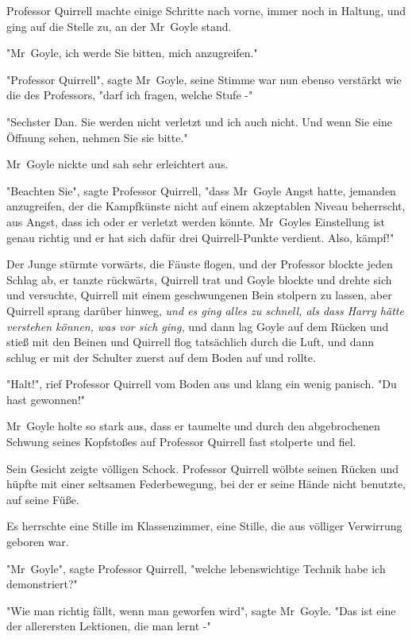 {Professor Quirrell machte einige Schritte nach vorne, immer noch in Haltung, und ging auf die Stelle zu, an der Mr~Goyle stand.

"Mr~Goyle, ich werde Sie bitten, mich anzugreifen."

"Professor Quirrell", sagte Mr~Goyle, seine Stimme war nun ebenso verstärkt wie die des Professors, "darf ich fragen, welche Stufe -"

"Sechster Dan. Sie werden nicht verletzt und ich auch nicht. Und wenn Sie eine Öffnung sehen, nehmen Sie sie bitte."

Mr~Goyle nickte und sah sehr erleichtert aus.

"Beachten Sie", sagte Professor Quirrell, "dass Mr~Goyle Angst hatte, jemanden anzugreifen, der die Kampfkünste nicht auf einem akzeptablen Niveau beherrscht, aus Angst, dass ich oder er verletzt werden könnte. Mr~Goyles Einstellung ist genau richtig und er hat sich dafür drei Quirrell-Punkte verdient. Also, kämpf!"

Der Junge stürmte vorwärts, die Fäuste flogen, und der Professor blockte jeden Schlag ab, er tanzte rückwärts, Quirrell trat und Goyle blockte und drehte sich und versuchte, Quirrell mit einem geschwungenen Bein stolpern zu lassen, aber Quirrell sprang darüber hinweg, \emph{und es ging alles zu schnell, als dass Harry hätte verstehen können, was vor sich ging,} und dann lag Goyle auf dem Rücken und stieß mit den Beinen und Quirrell flog tatsächlich durch die Luft, und dann schlug er mit der Schulter zuerst auf dem Boden auf und rollte.

"Halt!", rief Professor Quirrell vom Boden aus und klang ein wenig panisch. "Du hast gewonnen!"

Mr~Goyle holte so stark aus, dass er taumelte und durch den abgebrochenen Schwung seines Kopfstoßes auf Professor Quirrell fast stolperte und fiel.

Sein Gesicht zeigte völligen Schock. Professor Quirrell wölbte seinen Rücken und hüpfte mit einer seltsamen Federbewegung, bei der er seine Hände nicht benutzte, auf seine Füße.

Es herrschte eine Stille im Klassenzimmer, eine Stille, die aus völliger Verwirrung geboren war.

"Mr~Goyle", sagte Professor Quirrell, "welche lebenswichtige Technik habe ich demonstriert?"

"Wie man richtig fällt, wenn man geworfen wird", sagte Mr~Goyle. "Das ist eine der allerersten Lektionen, die man lernt -"

}
